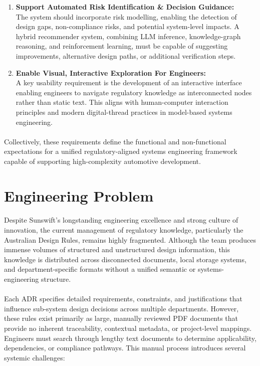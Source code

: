 \begin{enumerate}
          \item \textbf{Support Automated Risk Identification \& Decision Guidance:} \\ The system should incorporate risk modelling, enabling the detection of design gaps, non-compliance risks, and potential system-level impacts. A hybrid recommender system, combining LLM inference, knowledge-graph reasoning, and reinforcement learning, must be capable of suggesting improvements, alternative design paths, or additional verification steps.
          \item \textbf{Enable Visual, Interactive Exploration For Engineers:} \\ A key usability requirement is the development of an interactive interface enabling engineers to navigate regulatory knowledge as interconnected nodes rather than static text. This aligns with human-computer interaction principles and modern digital-thread practices in model-based systems engineering.
        \end{enumerate}
        
        \paragraph{} Collectively, these requirements define the functional and non-functional expectations for a unified regulatory-aligned systems engineering framework capable of supporting high-complexity automotive development.

    \section{Engineering Problem}

        \paragraph{} Despite Sunswift’s longstanding engineering excellence and strong culture of innovation, the current management of regulatory knowledge, particularly the Australian Design Rules, remains highly fragmented. Although the team produces immense volumes of structured and unstructured design information, this knowledge is distributed across disconnected documents, local storage systems, and department-specific formats without a unified semantic or systems-engineering structure.
        
        \paragraph{} Each ADR specifies detailed requirements, constraints, and justifications that influence sub-system design decisions across multiple departments. However, these rules exist primarily as large, manually reviewed PDF documents that provide no inherent traceability, contextual metadata, or project-level mappings. Engineers must search through lengthy text documents to determine applicability, dependencies, or compliance pathways. This manual process introduces several systemic challenges:

